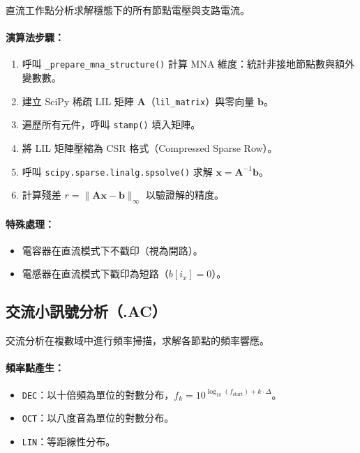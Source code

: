 \documentclass[12pt,a4paper]{article}
\begin{document}
直流工作點分析求解穩態下的所有節點電壓與支路電流。

\paragraph{演算法步驟：}
\begin{enumerate}
  \item 呼叫 \texttt{\_prepare\_mna\_structure()} 計算 MNA 維度：統計非接地節點數與額外變數數。
  \item 建立 SciPy 稀疏 LIL 矩陣 $\mathbf{A}$（\texttt{lil\_matrix}）與零向量 $\mathbf{b}$。
  \item 遍歷所有元件，呼叫 \texttt{stamp()} 填入矩陣。
  \item 將 LIL 矩陣壓縮為 CSR 格式（Compressed Sparse Row）。
  \item 呼叫 \texttt{scipy.sparse.linalg.spsolve()} 求解 $\mathbf{x} = \mathbf{A}^{-1}\mathbf{b}$。
  \item 計算殘差 $r = \|\mathbf{A}\mathbf{x} - \mathbf{b}\|_\infty$ 以驗證解的精度。
\end{enumerate}

\paragraph{特殊處理：}
\begin{itemize}
  \item 電容器在直流模式下不戳印（視為開路）。
  \item 電感器在直流模式下戳印為短路（$b[i_x] = 0$）。
\end{itemize}

\subsection{交流小訊號分析（.AC）}

交流分析在複數域中進行頻率掃描，求解各節點的頻率響應。

\paragraph{頻率點產生：}
\begin{itemize}
  \item \texttt{DEC}：以十倍頻為單位的對數分布，$f_k = 10^{\log_{10}(f_{\text{start}}) + k \cdot \Delta}$。
  \item \texttt{OCT}：以八度音為單位的對數分布。
  \item \texttt{LIN}：等距線性分布。
\end{itemize}
\end{document}
